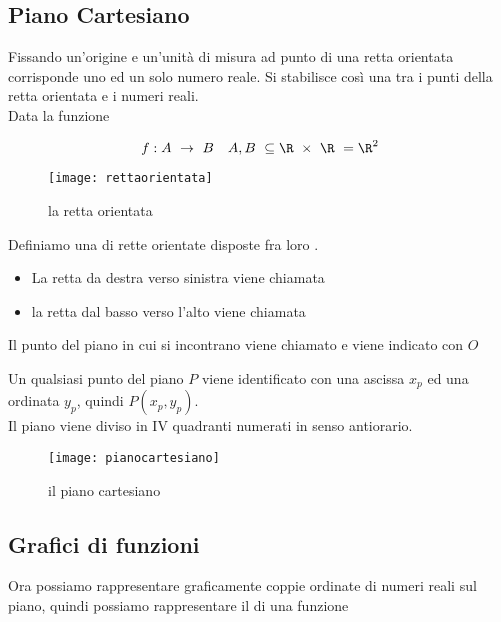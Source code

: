 \documentclass[../appunti.tex]{subfiles}
\begin{document}
\subsection{Piano Cartesiano}
Fissando un'origine e un'unità di misura ad  punto di una retta orientata corrisponde uno ed un solo numero reale.
Si stabilisce così una  tra i punti della retta orientata e i numeri reali.\\
Data la funzione
\vspace{1.5mm}

\begin{equation}
  f: A\ \rightarrow\ B \quad A,B\ \subseteq \R\ \times\ \R\ = \R^2\\
\end{equation}

\begin{figure}[ht]
  \center
  \texttt{[image: rettaorientata]}
  \caption{la retta orientata}
  \label{fig:retta_orientata}
\end{figure}

\begin{defn}
Definiamo una  di rette orientate disposte  fra loro .
\begin{itemize}
  \item{La retta da destra verso sinistra viene chiamata }
  \item{la retta dal basso verso l'alto viene chiamata }
\end{itemize}
Il punto del piano in cui si incontrano viene chiamato  e viene indicato con $O$
\end{defn}

Un qualsiasi punto del piano $P$ viene identificato con una ascissa $x_p$ ed una ordinata $y_p$, quindi $P(x_p, y_p)$.\\
Il piano viene diviso in IV quadranti numerati in senso antiorario.

\begin{figure}[ht]
  \center
  \texttt{[image: pianocartesiano]}
  \caption{il piano cartesiano}
  \label{fig:piano_cartesiano}
\end{figure}

\subsection{Grafici di funzioni}
\raggedright{Ora possiamo rappresentare graficamente coppie ordinate di numeri reali sul piano, quindi possiamo rappresentare il  di una funzione}
\end{document}
